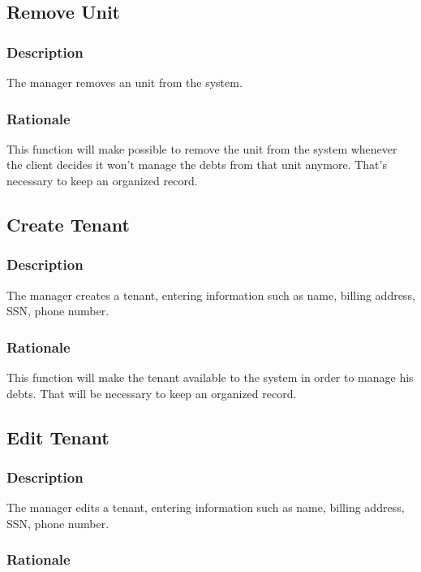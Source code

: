 \documentclass{scrreprt}
\begin{document}
\subsection{Remove Unit}
\subsubsection{Description}

The manager removes an unit from the system.

\subsubsection{Rationale}

This function will make possible to remove the unit from the system whenever the client decides it won't manage the debts from that unit anymore. That's necessary to keep an organized record.

\subsection{Create Tenant}
\subsubsection{Description}

The manager creates a tenant, entering information such as name, billing address, SSN, phone number.

\subsubsection{Rationale}

This function will make the tenant available to the system in order to manage his debts. That will be necessary to keep an organized record.

\subsection{Edit Tenant}
\subsubsection{Description}

The manager edits a tenant, entering information such as name, billing address, SSN, phone number.

\subsubsection{Rationale}
\end{document}

